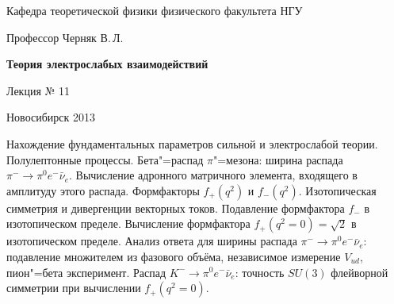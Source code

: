 \documentclass[12pt,pagesize,paper=192mm:108mm]{scrbook}
\begin{document}
\begin{titlepage}
\begin{center}
    Кафедра теоретической физики физического факультета НГУ
    \medskip

    \Large
    Профессор Черняк В.\,Л.
    \bigskip

    \huge
    \textbf{Теория электрослабых взаимодействий}
    \bigskip

    \Large
    Лекция № 11
    \vfill

    \vfill

\normalsize    Новосибирск 2013
  \smallskip

  \ccbysa
  \end{center}
\end{titlepage}
\newpage

\vspace*{-1em}
\begin{center}
 \vfill
  \begin{minipage}{0.66\linewidth}
    Нахождение фундаментальных параметров сильной и электрослабой
    теории. Полулептонные процессы. Бета"=распад $\pi$"=мезона: ширина
    распада $\pi^-\to\pi^0 e^-\bar{\nu}_e$.  Вычисление адронного
    матричного элемента, входящего в амплитуду этого распада.
    Формфакторы $f_+(q^2)$ и $f_-(q^2)$.  Изотопическая симметрия и
    дивергенции векторных токов. Подавление формфактора $f_-$ в
    изотопическом пределе.  Вычисление формфактора
    $f_+(q^2=0)=\sqrt{2}$ в изотопическом пределе.  Анализ ответа для
    ширины распада $\pi^-\to\pi^0 e^-\bar{\nu}_e$: подавление
    множителем из фазового объёма, независимое измерение $V_{ud}$,
    пион"=бета эксперимент.  Распад $K^-\to\pi^0 e^-\bar{\nu}_e$:
    точность $SU(3)$ флейворной симметрии при вычислении $f_+(q^2=0)$.
  \end{minipage}
  \vfill

\end{center}
\end{document}
